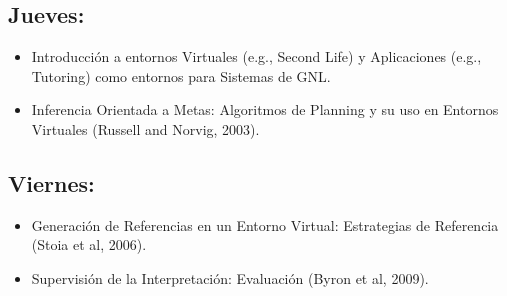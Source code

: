 \documentclass[a4paper]{article}
\begin{document}
\subsection*{Jueves:} 

\begin{itemize}
\item Introducci\'on a entornos Virtuales (e.g., Second Life) y Aplicaciones (e.g., Tutoring) como entornos para Sistemas de GNL. 
\item Inferencia Orientada a Metas: Algoritmos de Planning y su uso en Entornos Virtuales (Russell and Norvig, 2003). 
\end{itemize}

\subsection*{Viernes:} 
\begin{itemize}
\item Generaci\'on de Referencias en un Entorno Virtual: Estrategias de Referencia (Stoia et al, 2006).
\item Supervisi\'on de la Interpretaci\'on: Evaluaci\'on (Byron et al, 2009).  
\end{itemize}
\end{document}
